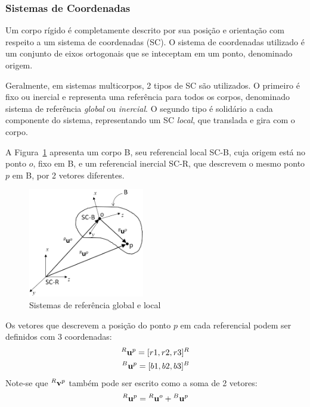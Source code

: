 \subsubsection{Sistemas de Coordenadas}

Um corpo rígido é completamente descrito por sua posição e orientação com
respeito a um sistema de coordenadas (SC). O sistema de coordenadas utilizado é
um conjunto de eixos ortogonais que se inteceptam em um ponto, denominado
origem.

Geralmente, em sistemas multicorpos, 2 tipos de SC são utilizados. O primeiro é
fixo ou inercial e representa uma referência para todos os corpos, denominado
sistema de referência \emph{global} ou \emph{inercial}. O segundo tipo é
solidário a cada componente do sistema, representando um SC \emph{local}, que
translada e gira com o corpo.

A Figura~\ref{fig::sist_refs} apresenta um corpo B, seu referencial local SC-B,
cuja origem está no ponto $o$, fixo em B, e um referencial inercial SC-R, que
descrevem o mesmo ponto $p$ em B, por 2 vetores diferentes.

\begin{figure}[h]
	\centering 
 	\includegraphics[width=0.45\textwidth]{figs/sist_refs}
 	\caption{Sistemas de referência global e local}
 	\label{fig::sist_refs}
\end{figure}

Os vetores que descrevem a posição do ponto $p$ em cada referencial podem ser
definidos com 3 coordenadas:
%
\begin{align}
	^{R}\textrm{\textbf{u}}^{p} = [r1, r2, r3]^{R} \\
	^{B}\textrm{\textbf{u}}^{p} = [b1, b2, b3]^{B}
\end{align}
%
Note-se que $^{R}\textrm{\textbf{v}}^{p}$ também pode ser escrito como a soma de
2 vetores:
%
\begin{equation}
	^{R}\textrm{\textbf{u}}^{p} = {}^{R}\textrm{\textbf{u}}^{o} + 
	{}^{B}\textrm{\textbf{u}}^{p}
\end{equation}
%

